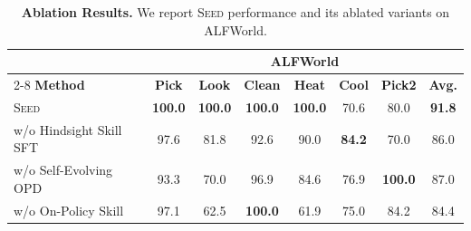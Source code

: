 \begin{table}[ht!]
\centering
\caption{
    \textbf{Ablation Results.}
    We report \textsc{Seed} performance and its ablated variants on ALFWorld.
}
\vspace{0.05in}
\label{tab:ablation_seed}
\small
\renewcommand{\arraystretch}{1.08}
\begin{tabular}{lccccccc}
\toprule
& \multicolumn{7}{c}{\textbf{ALFWorld}} \\
\cmidrule(lr){2-8}
\textbf{Method}
& \textbf{Pick}
& \textbf{Look}
& \textbf{Clean}
& \textbf{Heat}
& \textbf{Cool}
& \textbf{Pick2}
& \textbf{Avg.} \\
\midrule
\rowcolor{gray!10}
\textsc{Seed}
    & \textbf{100.0}
    & \textbf{100.0}
    & \textbf{100.0}
    & \textbf{100.0}
    & 70.6
    & 80.0
    & \textbf{91.8}
    \\
\;\;\;w/o Hindsight Skill SFT
    & 97.6
    & 81.8
    & 92.6
    & 90.0
    & \textbf{84.2}
    & 70.0
    & 86.0
    \\
\;\;\;w/o Self-Evolving OPD
    & 93.3
    & 70.0
    & 96.9
    & 84.6
    & 76.9
    & \textbf{100.0}
    & 87.0
    \\
\;\;\;w/o On-Policy Skill
    & 97.1
    & 62.5
    & \textbf{100.0}
    & 61.9
    & 75.0
    & 84.2
    & 84.4
    \\
\bottomrule
\end{tabular}
\end{table}